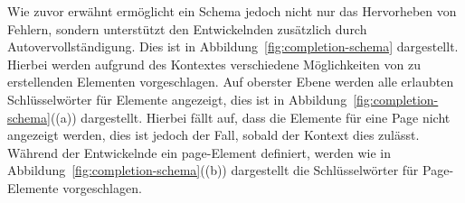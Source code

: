 Wie zuvor erwähnt ermöglicht ein Schema jedoch nicht nur das Hervorheben von Fehlern, sondern unterstützt den Entwickelnden zusätzlich durch Autovervollständigung.
Dies ist in Abbildung~\ref{fig:completion-schema} dargestellt.
Hierbei werden aufgrund des Kontextes verschiedene Möglichkeiten von zu erstellenden Elementen vorgeschlagen.
Auf oberster Ebene werden alle erlaubten Schlüsselwörter für Elemente angezeigt, dies ist in Abbildung~\ref{fig:completion-schema}((a)) dargestellt.
Hierbei fällt auf, dass die Elemente für eine Page nicht angezeigt werden, dies ist jedoch der Fall, sobald der Kontext dies zulässt.
Während der Entwickelnde ein page-Element definiert, werden wie in Abbildung~\ref{fig:completion-schema}((b)) dargestellt die Schlüsselwörter für Page-Elemente vorgeschlagen.
